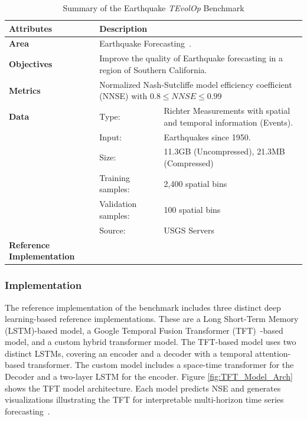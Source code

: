 \begin{table}
\caption{Summary of the Earthquake {\em TEvolOp} Benchmark}\label{tab:eq-summary}
\begin{center}
  {\footnotesize
\begin{tabular}{|p{}p{}p{}|}
\hline
{\bf Attributes} & {\bf Description} \\
\hline
\hline
{\bf Area} & \multicolumn{2}{l|}{Earthquake Forecasting~\citep{fox2022-jm,TFT-21,eq-code,eq-data}.}\\
\hline
{\bf Objectives} &  \multicolumn{2}{l|}{Improve the quality of Earthquake
forecasting in a region of Southern California.}\\
\hline
{\bf Metrics} & \multicolumn{2}{l|}{Normalized Nash-Sutcliffe model efficiency coefficient (NNSE) with $0.8\leq NNSE\leq 0.99$}\\
\hline
{\bf Data}  & Type:  & Richter Measurements with spatial and temporal information (Events). \\
  &  Input:  & Earthquakes since 1950.\\
  &  Size:  & 11.3GB (Uncompressed), 21.3MB (Compressed)\\
  & Training samples: & 2,400 spatial bins\\
  & Validation samples:  &  100 spatial bins\\
  & Source:  & USGS Servers~\citep{eq-data}\\
\hline
{\bf Reference Implementation} & \citep{eq-code} & \\
\hline
\end{tabular}
}
\end{center}
\end{table}


\subsubsection{Implementation}

The reference implementation of the benchmark includes three distinct deep learning-based reference implementations. These are a Long Short-Term Memory (LSTM)-based model, a Google Temporal Fusion Transformer (TFT)~\citep{TFT-21}-based model, and a custom hybrid transformer model. The TFT-based model uses two distinct LSTMs, covering an encoder and a decoder with a temporal attention-based transformer. The custom model includes a space-time transformer for the Decoder and a two-layer LSTM for the encoder. Figure \ref{fig:TFT_Model_Arch} shows the TFT model architecture. Each model predicts NSE and generates visualizations illustrating the TFT for interpretable multi-horizon time series forecasting~\citep{TFT-21}.

